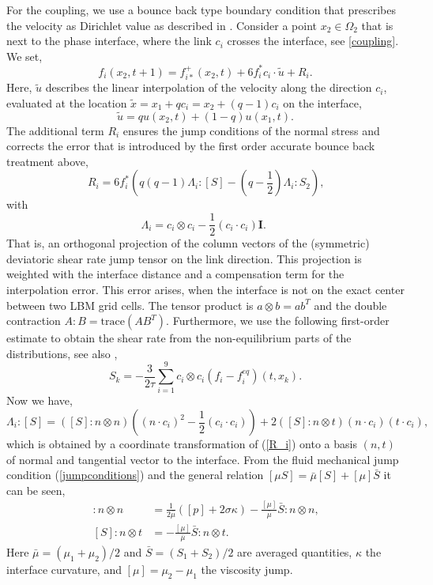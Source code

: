 \documentclass[final,leqno,onefignum,onetabnum]{siamltexmm}
\begin{document}
For the coupling, we use a bounce back type boundary condition that prescribes the velocity as Dirichlet value as described in \cite[p. 1146]{Thoemmes}. Consider a point $x_2 \in \Omega_2$ that is next to the phase interface, where the link $c_i$ crosses the interface, see \cref{coupling}. We set,
\begin{equation}
	f_i(x_2,t+1) = f_{i*}^+(x_2,t) + 6f_i^*c_i \cdot \tilde{u} + R_i \text{.}
\end{equation}
Here, $\tilde{u}$ describes the linear interpolation of the velocity along the direction $c_i$, evaluated at the location $\tilde{x} = x_1 + qc_i = x_2 + (q-1)c_i$ on the interface,
$$
\tilde{u} = qu(x_2,t) + (1-q)u(x_1,t) \text{.}
$$
The additional term $R_i$ ensures the jump conditions of the normal stress and corrects the error that is introduced by the first order accurate bounce back treatment above,
\begin{equation}
  R_i = 6f_i^* \left(q(q-1)\Lambda_i:[S] - (q-\frac12)\Lambda_i:S_2 \right) \text{,}
  \label{R_i}
\end{equation}
with
\begin{equation}
  \Lambda_i = c_i \otimes c_i - \frac12 (c_i \cdot c_i) \mathbf{I} \text{. }
\end{equation}
That is, an orthogonal projection of the column vectors of the (symmetric) deviatoric shear rate jump tensor on the link direction. This projection is weighted with the interface distance and a compensation term for the interpolation error. This error arises, when the interface is not on the exact center between two LBM grid cells. The tensor product is $a \otimes b = ab^T$ and the double contraction $A:B = \mathrm{trace}(AB^T)$. Furthermore, we use the following first-order estimate to obtain the shear rate from the non-equilibrium parts of the distributions, see also \cite{Krueger},
\begin{equation}
  S_k = -\frac{3}{2\tau } \sum_{i=1}^9 c_i \otimes c_i(f_i-f_i^{eq})(t,x_k) \text{.}
\end{equation}
Now we have,
\begin{equation}
  \Lambda_i:[S] = ([S]:n \otimes n)((n \cdot c_i)^2 - \frac12 (c_i \cdot c_i)) + 2([S]:n \otimes t)(n \cdot c_i)(t \cdot c_i) \text{,}
  \label{Lambda_iTimes_S}
\end{equation}
which is obtained by a coordinate transformation of (\ref{R_i}) onto a basis $(n, t)$ of normal and tangential vector to the interface. From the fluid mechanical jump condition (\ref{jumpconditions}) and the general relation $[\mu S] = \bar{\mu}[S] + [\mu]\bar{S} $ it can be seen,
\begin{align}
  [S]:n \otimes n &=  \frac{1}{2 \bar\mu} ([p] + 2 \sigma \kappa) - \frac{[\mu]}{\bar{\mu}} \bar{S} : n \otimes n \text{,} \\
  [S]:n \otimes t &= - \frac{[\mu]}{\bar{\mu}} \bar{S} : n \otimes t \text{.}
\end{align}
Here $\bar{\mu} = (\mu_1 + \mu_2)/2$ and $\bar{S} = (S_1 + S_2)/2$ are averaged quantities, $\kappa$ the interface curvature, and  $[\mu] = \mu_2 - \mu_1$ the viscosity jump.
\end{document}
